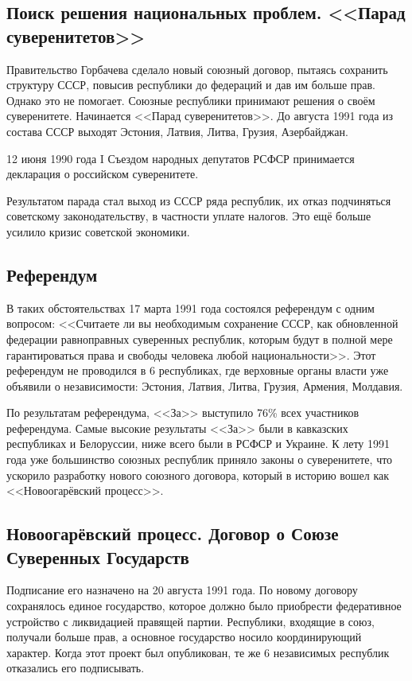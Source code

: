 \subsection{Поиск решения национальных проблем. <<Парад суверенитетов>>}
Правительство Горбачева сделало новый союзный договор, пытаясь сохранить структуру СССР, повысив республики до федераций и дав им больше прав. Однако это не помогает. Союзные республики принимают решения о своём суверенитете. Начинается <<Парад суверенитетов>>. До августа 1991 года из состава СССР выходят Эстония, Латвия, Литва, Грузия, Азербайджан. 

12 июня 1990 года I Съездом народных депутатов РСФСР принимается декларация о российском суверенитете.

Результатом парада стал выход из СССР ряда республик, их отказ подчиняться советскому законодательству, в частности уплате налогов. Это ещё больше усилило кризис советской экономики.

\subsection{Референдум}
    
В таких обстоятельствах 17 марта 1991 года состоялся референдум с одним вопросом: <<Считаете ли вы необходимым сохранение СССР, как обновленной федерации равноправных суверенных республик, которым будут в полной мере гарантироваться права и свободы человека любой национальности>>. Этот референдум не проводился в 6 республиках, где верховные органы власти уже объявили о независимости: Эстония, Латвия, Литва, Грузия, Армения, Молдавия. 

По результатам референдума, <<За>> выступило 76\% всех участников референдума. Самые высокие результаты <<За>> были в кавказских республиках и Белоруссии, ниже всего были в РСФСР и Украине. К лету 1991 года уже большинство союзных республик приняло законы о суверенитете, что ускорило разработку нового союзного договора, который в историю вошел как <<Новоогарёвский процесс>>. 

\subsection{Новоогарёвский процесс. Договор о Союзе Суверенных Государств}

Подписание его назначено на 20 августа 1991 года. По новому договору сохранялось единое государство, которое должно было приобрести федеративное устройство с ликвидацией правящей партии. Республики, входящие в союз, получали больше прав, а основное государство носило координирующий характер. Когда этот проект был опубликован, те же 6 независимых республик отказались его подписывать. 


